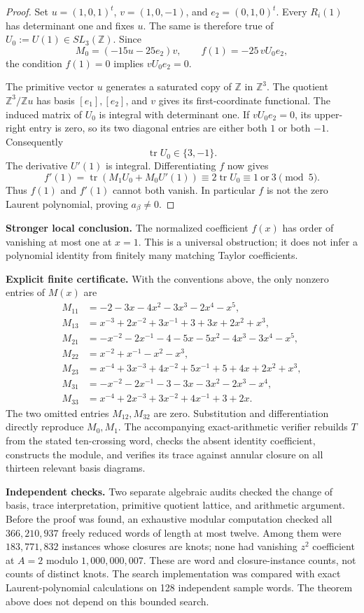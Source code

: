 \documentclass[11pt]{article}
\newcommand{\Z}{\mathbb Z}
\newcommand{\tr}{\operatorname{tr}}
\begin{document}
\begin{proof}
Set $u=(1,0,1)^t$, $v=(1,0,-1)$, and $e_2=(0,1,0)^t$.
Every $R_i(1)$ has determinant one and fixes $u$. The same is therefore true of $U_0:=U(1)\in SL_3(\Z)$. Since
\[
 M_0=(-15u-25e_2)v,
 \qquad f(1)=-25\,vU_0e_2,
\]
the condition $f(1)=0$ implies $vU_0e_2=0$.

The primitive vector $u$ generates a saturated copy of $\Z$ in $\Z^3$.
The quotient $\Z^3/\Z u$ has basis $[e_1],[e_2]$, and $v$ gives its first-coordinate functional. The induced matrix of $U_0$ is integral with determinant one. If $vU_0e_2=0$, its upper-right entry is zero, so its two diagonal entries are either both $1$ or both $-1$. Consequently
\[
 \tr U_0\in\{3,-1\}.
\]
The derivative $U'(1)$ is integral. Differentiating $f$ now gives
\[
 f'(1)=\tr(M_1U_0+M_0U'(1))
      \equiv 2\tr U_0
      \equiv1\ \text{or}\ 3\pmod5.
\]
Thus $f(1)$ and $f'(1)$ cannot both vanish. In particular $f$ is not the zero Laurent polynomial, proving $a_\beta\ne0$.
\end{proof}

\noindent\textbf{Stronger local conclusion.}
The normalized coefficient $f(x)$ has order of vanishing at most one at $x=1$. This is a universal obstruction; it does not infer a polynomial identity from finitely many matching Taylor coefficients.

\newpage
\noindent\textbf{Explicit finite certificate.}
With the conventions above, the only nonzero entries of $M(x)$ are
\begin{align*}
 M_{11}&=-2-3x-4x^2-3x^3-2x^4-x^5,\\
 M_{13}&=x^{-3}+2x^{-2}+3x^{-1}+3+3x+2x^2+x^3,\\
 M_{21}&=-x^{-2}-2x^{-1}-4-5x-5x^2-4x^3-3x^4-x^5,\\
 M_{22}&=x^{-2}+x^{-1}-x^2-x^3,\\
 M_{23}&=x^{-4}+3x^{-3}+4x^{-2}+5x^{-1}+5+4x+2x^2+x^3,\\
 M_{31}&=-x^{-2}-2x^{-1}-3-3x-3x^2-2x^3-x^4,\\
 M_{33}&=x^{-4}+2x^{-3}+3x^{-2}+4x^{-1}+3+2x.
\end{align*}
The two omitted entries $M_{12},M_{32}$ are zero. Substitution and differentiation directly reproduce $M_0,M_1$. The accompanying exact-arithmetic verifier rebuilds $T$ from the stated ten-crossing word, checks the absent identity coefficient, constructs the module, and verifies its trace against annular closure on all thirteen relevant basis diagrams.

\medskip
\noindent\textbf{Independent checks.}
Two separate algebraic audits checked the change of basis, trace interpretation, primitive quotient lattice, and arithmetic argument. Before the proof was found, an exhaustive modular computation checked all $366{,}210{,}937$ freely reduced words of length at most twelve. Among them were $183{,}771{,}832$ instances whose closures are knots; none had vanishing $z^2$ coefficient at $A=2$ modulo $1{,}000{,}000{,}007$. These are word and closure-instance counts, not counts of distinct knots. The search implementation was compared with exact Laurent-polynomial calculations on 128 independent sample words. The theorem above does not depend on this bounded search.
\end{document}
